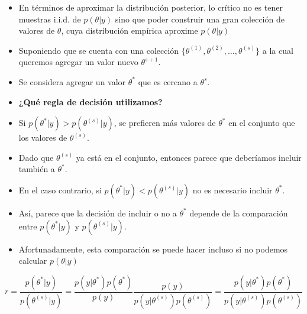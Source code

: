 \documentclass[11pt]{beamer}
\begin{document}
\begin{frame}
	\begin{itemize}
		\item En términos de aproximar la distribución posterior, lo crítico no es tener muestras i.i.d. de $p(\theta |y)$ sino que poder construir una gran colección de valores de $\theta$, cuya distribución empírica aproxime $p(\theta | y)$
		\item Suponiendo que se cuenta con una colección $\lbrace \theta^{(1)},\theta^{(2)}, \hdots, \theta^{(s)}\rbrace$ a la cual queremos agregar un valor nuevo $\theta^{s+1}$.
		\item Se considera agregar un valor $\theta^{*}$ que es cercano a $\theta^{s}$.
		\item \textbf{¿Qué regla de decisión utilizamos?}
	\end{itemize}
\end{frame}

\begin{frame}
	\begin{itemize}
				\item Si $p(\theta^{*}|y) > p(\theta^{(s)}|y)$, se prefieren más valores de $\theta^{*}$ en el conjunto que los valores de $\theta^{(s)}$.
				\item Dado que $\theta^{(s)}$ ya está en el conjunto, entonces parece que deberíamos incluir también a $\theta^{*}$.
		\item En el caso contrario, si $p(\theta^{*}|y) < p(\theta^{(s)}|y)$ no es necesario incluir $\theta^{*}$.
		\item Así, parece que la decisión de incluir o no a $\theta^{*}$ depende de la comparación entre $p(\theta^{*}|y)$ y $p(\theta^{(s)}|y)$. 
		\item Afortunadamente, esta comparación se puede hacer incluso si no podemos calcular $p(\theta | y)$
	\end{itemize}
	\begin{equation}
	r = \dfrac{p(\theta^{*} | y)}{p(\theta^{(s)} | y)} = \dfrac{p(y | \theta^{*}) p(\theta^{*})}{p(y)} \dfrac{p(y)}{p(y | \theta^{(s)})p(\theta^{(s)})} = \dfrac{p(y | \theta^{*}) p(\theta^{*})}{p(y | \theta^{(s)})p(\theta^{(s)})}
	\end{equation}
\end{frame}
\end{document}
